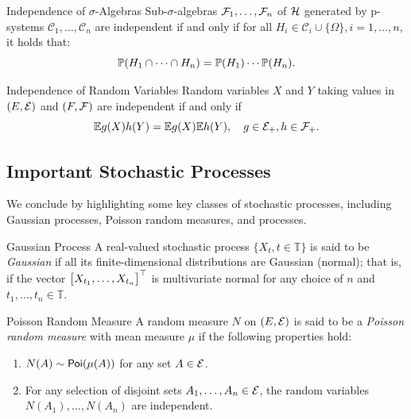 \begin{thm}{Independence of \(\sigma\)-Algebras}{}
	Sub-\(\sigma\)-algebras \(\mathcal{F}_1, \dots, \mathcal{F}_n\) of \(\mathcal{H}\) generated by p-systems \(\mathcal{C}_1, \dots, \mathcal{C}_n\) are independent if and only if for all \(H_i \in \mathcal{C}_i \cup \{\Omega\}, i = 1, \dots, n\), it holds that:
	\begin{equation}
		\mathbb{P}(H_1 \cap \dots \cap H_n) = \mathbb{P}(H_1) \cdots \mathbb{P}(H_n).
		\label{eq:ProductMeasureOnPiSystem}
	\end{equation}
\end{thm}

\begin{thm}{Independence of Random Variables}{}
	Random variables \(X\) and \(Y\) taking values in \((E, \mathcal{E})\) and \((F, \mathcal{F})\) are independent if and only if
	\begin{equation}
		\mathbb{E} g(X) h(Y) = \mathbb{E} g(X) \mathbb{E} h(Y), \quad g \in \mathcal{E}_+, h \in \mathcal{F}_+.
		\label{eq:IndependenceViaExpectation}
	\end{equation}
\end{thm}

\subsection{Important Stochastic Processes}
We conclude by highlighting some key classes of stochastic processes, including Gaussian processes, Poisson random measures, and \Levy{} processes.

\begin{defn}{Gaussian Process}{}
	A real-valued stochastic process \(\{X_t, t \in \mathbb{T}\}\) is said to be \textit{Gaussian} if all its finite-dimensional distributions are Gaussian (normal); that is, if the vector \(\bigl[X_{t_1}, \dots, X_{t_n}\bigr]^{\top}\) is multivariate normal for any choice of \(n\) and \(t_1, \dots, t_n \in \mathbb{T}\).
\end{defn}

\begin{defn}{Poisson Random Measure}{}
	A random measure \(N\) on \((E, \mathcal{E})\) is said to be a \textit{Poisson random measure} with mean measure \(\mu\) if the following properties hold:
	\begin{enumerate}
		\item \(N(A) \sim \mathsf{Poi}(\mu(A))\) for any set \(A \in \mathcal{E}\).
		\item For any selection of disjoint sets \(A_1, \dots, A_n \in \mathcal{E}\), the random variables \(N(A_1), \dots, N(A_n)\) are independent.
	\end{enumerate}
\end{defn}

